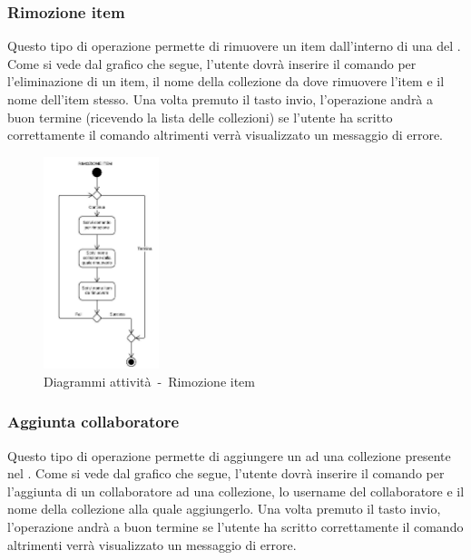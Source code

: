 \documentclass{scalatekids-article}
\begin{document}
\subsubsection{Rimozione item}

Questo tipo di operazione permette di rimuovere un item dall'interno di una
 del . Come si vede dal grafico che segue, l'utente
dovrà inserire il comando per l'eliminazione di un item, il nome della
collezione da dove rimuovere l'item e il nome dell'item stesso. Una volta
premuto il tasto invio, l'operazione andrà a buon termine (ricevendo la lista
delle collezioni) se l'utente ha scritto correttamente il comando altrimenti
verrà visualizzato un messaggio di errore.

\begin{figure}[H]
  \begin{center}
    \includegraphics[width=0.3\textwidth, keepaspectratio]{img/diagrammiAttivita/rimozioneItem.jpeg}
    \caption{Diagrammi attività\ -\ Rimozione item}
  \end{center}
\end{figure}

\subsubsection{Aggiunta collaboratore}

Questo tipo di operazione permette di aggiungere un  ad
una collezione presente nel . Come si vede dal grafico che segue,
l'utente dovrà inserire il comando per l'aggiunta di un collaboratore ad una
collezione, lo username del collaboratore e il nome della collezione alla
quale aggiungerlo. Una volta premuto il tasto invio, l'operazione andrà a buon
termine se l'utente ha scritto correttamente il comando altrimenti verrà
visualizzato un messaggio di errore.
\end{document}
